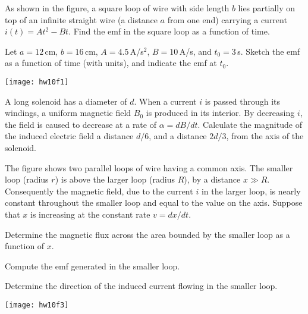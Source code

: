\documentclass[11pt]{hmcpset}
\begin{document}
\begin{problem}[1. HRK: E34.13 (a)] As shown in the figure, a square loop of wire with side length $b$ lies partially on top of an infinite straight wire (a distance $a$ from one end) carrying a current $i(t) = A t^2 - B t$. Find the emf in the square loop as a function of time.

 Let $a=12$\,cm, $b=16$\,cm, $A=4.5$\,A/s$^2$, $B=10$\,A/s, and $t_0=3$\,s. Sketch the emf as a function of time (with units), and indicate the emf at $t_0$. 
\begin{center}
		\texttt{[image: hw10f1]}
		\end{center}

\end{problem}
\newpage

\begin{problem}[2. HRK: E34.30]
A long solenoid has a diameter of $d$. When a current $i$ is passed through its windings, a uniform magnetic field $B_0$ is produced in its interior. By decreasing $i$, the field is caused to decrease at a rate of $\alpha = dB/dt$. Calculate the magnitude of the induced electric field a distance $d/6$, and a distance $2d/3$, from the axis of the solenoid.

\end{problem}
\newpage

\begin{problem}[3. HRK: P34.6]
The figure shows two parallel loops of wire having a common axis. The smaller loop (radius $r$) is above the larger loop (radius $R$), by a distance $x \gg R$. Consequently the magnetic field, due to the current $i$ in the larger loop, is nearly constant throughout the smaller loop and equal to the value on the axis. Suppose that $x$ is increasing at the constant rate $v = dx/dt$.

 Determine the magnetic flux across the area bounded by the smaller loop as a function of $x$.

 Compute the emf generated in the smaller loop.

 Determine the direction of the induced current flowing in the smaller loop.
\begin{center}
		\texttt{[image: hw10f3]}
		\end{center}
\end{problem}
\newpage
\end{document}
